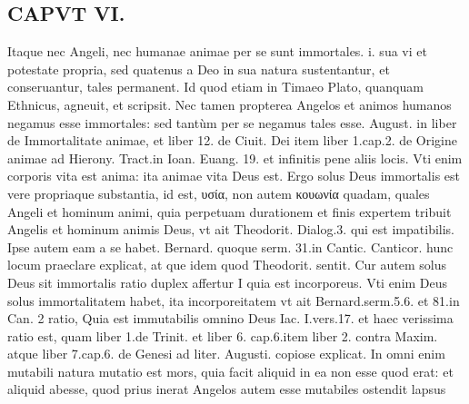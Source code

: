 \documentclass{article}
\begin{document}
\begin{pages}
\section*{CAPVT  VI. }
\marginpar{[ p.485 ]}\pstart Itaque nec Angeli, nec humanae animae per se sunt immortales. i. sua vi et potestate propria, sed quatenus a Deo in sua natura sustentantur, et conseruantur, tales permanent. Id quod etiam in Timaeo Plato, quanquam Ethnicus, agneuit, et scripsit. Nec tamen propterea Angelos et animos humanos negamus esse immortales: sed tantùm per se negamus tales esse. August. in liber  de Immortalitate animae, et liber  12. de Ciuit. Dei item liber 1.cap.2. de Origine animae ad Hierony. Tract.in Ioan. Euang. 19. et infinitis pene aliis locis. Vti enim corporis vita est anima: ita animae vita Deus est. Ergo solus Deus immortalis est vere propriaque substantia, id est, υσία, non autem κουωνία quadam, quales Angeli et hominum animi, quia perpetuam durationem et finis expertem tribuit Angelis et hominum animis Deus, vt ait Theodorit. Dialog.3. qui est impatibilis. Ipse autem eam a se habet. Bernard. quoque serm. 31.in Cantic. Canticor. hunc locum praeclare explicat, at que idem quod Theodorit. sentit.  \pend\pstart Cur autem solus Deus sit immortalis ratio duplex affertur I quia est incorporeus. Vti enim Deus solus immortalitatem habet, ita incorporeitatem vt ait Bernard.serm.5.6. et 81.in Can. 2 ratio, Quia est immutabilis omnino Deus Iac. I.vers.17. et haec verissima ratio est, quam liber  1.de Trinit. et liber 6. cap.6.item liber 2. contra Maxim. atque liber 7.cap.6. de Genesi ad liter. Augusti. copiose explicat. In omni enim mutabili natura mutatio est mors, quia facit aliquid in ea non esse quod erat: et aliquid abesse, quod prius inerat Angelos autem esse mutabiles ostendit lapsus  \pend

\end{pages}
\end{document}
